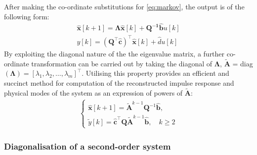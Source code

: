 After making the co-ordinate substitutions for \eqref{eq:markov}, the output is of the following form:
\begin{align}
\label{eq:markov-eig}
    \mathbf{\hat{x}}[k + 1] = \mathbf{\Lambda} \mathbf{ \hat{x}}[k] + \mathbf{Q^{-1} \hat{b}}u[k]\\
    y[k] = \left( \mathbf{Q}^{\top} \hat{\mathbf{c}} \right)^{\top} \hat{\mathbf{x}}[k] + \hat{d}u[k]
\end{align}
By exploiting the diagonal nature of the the eigenvalue matrix, a further co-ordinate transformation can be carried out by taking the diagonal of $\mathbf{\Lambda}$, $\tilde{\mathbf{A}}$ = diag$(\mathbf{\Lambda}) = [\lambda_1, \lambda_2, \dots, \lambda_m]^{\top}$. Utilising this property provides an efficient and succinct method for computation of the reconstructed impulse response and physical modes of the system as an expression of powers of $\tilde{\mathbf{A}}$:
\begin{align}
\label{eq:markov-again}
\begin{cases}
    \mathbf{\hat{x}}[k + 1] =  \tilde{\mathbf{A}}^{k-1} \mathbf{Q}^{-1} \hat{\mathbf{b}}, \\
    \tilde{y}[k] =  \hat{\mathbf{c}}^{\top} \mathbf{Q} \tilde{\mathbf{A}}^{k-1}\hat{\mathbf{b}}, \quad k \geq 2
\end{cases}
\end{align}

\subsubsection{Diagonalisation of a second-order system}
\label{sec:second-order}

